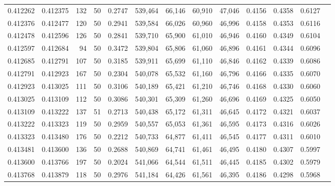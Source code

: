 \begin{tabular}{rrrrrrrrrrrrr}
0.412262 & 0.412375 &   132 &  50 &                                     0.2747 & 539,464 &  66,146 &  60,910 &  47,046 & 0.4156 & 0.4358 & 0.6127 \\
0.412376 & 0.412477 &   120 &  50 &                                     0.2941 & 539,584 &  66,026 &  60,960 &  46,996 & 0.4158 & 0.4353 & 0.6116 \\
0.412478 & 0.412596 &   126 &  50 &                                     0.2841 & 539,710 &  65,900 &  61,010 &  46,946 & 0.4160 & 0.4349 & 0.6104 \\
0.412597 & 0.412684 &    94 &  50 &                                     0.3472 & 539,804 &  65,806 &  61,060 &  46,896 & 0.4161 & 0.4344 & 0.6096 \\
0.412685 & 0.412791 &   107 &  50 &                                     0.3185 & 539,911 &  65,699 &  61,110 &  46,846 & 0.4162 & 0.4339 & 0.6086 \\
0.412791 & 0.412923 &   167 &  50 &                                     0.2304 & 540,078 &  65,532 &  61,160 &  46,796 & 0.4166 & 0.4335 & 0.6070 \\
0.412923 & 0.413025 &   111 &  50 &                                     0.3106 & 540,189 &  65,421 &  61,210 &  46,746 & 0.4168 & 0.4330 & 0.6060 \\
0.413025 & 0.413109 &   112 &  50 &                                     0.3086 & 540,301 &  65,309 &  61,260 &  46,696 & 0.4169 & 0.4325 & 0.6050 \\
0.413109 & 0.413222 &   137 &  51 &                                     0.2713 & 540,438 &  65,172 &  61,311 &  46,645 & 0.4172 & 0.4321 & 0.6037 \\
0.413222 & 0.413323 &   119 &  50 &                                     0.2959 & 540,557 &  65,053 &  61,361 &  46,595 & 0.4173 & 0.4316 & 0.6026 \\
0.413323 & 0.413480 &   176 &  50 &                                     0.2212 & 540,733 &  64,877 &  61,411 &  46,545 & 0.4177 & 0.4311 & 0.6010 \\
0.413481 & 0.413600 &   136 &  50 &                                     0.2688 & 540,869 &  64,741 &  61,461 &  46,495 & 0.4180 & 0.4307 & 0.5997 \\
0.413600 & 0.413766 &   197 &  50 &                                     0.2024 & 541,066 &  64,544 &  61,511 &  46,445 & 0.4185 & 0.4302 & 0.5979 \\
0.413768 & 0.413879 &   118 &  50 &                                     0.2976 & 541,184 &  64,426 &  61,561 &  46,395 & 0.4186 & 0.4298 & 0.5968 \\

\end{tabular}
